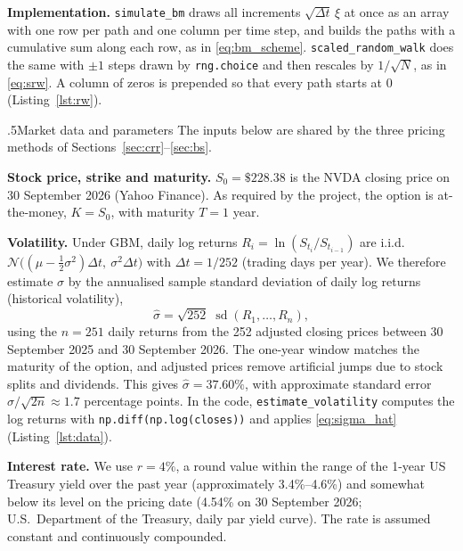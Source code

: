 \documentclass[12pt]{amsart}
\makeatletter
\def\subsection{\@startsection{subsection}{2}{\z@}{.7\linespacing\@plus\linespacing}%
  {.5\linespacing}{\normalfont\bfseries}}
\newcommand{\N}{\mathcal{N}}
\makeatother
\begin{document}
\noindent\textbf{Implementation.} \texttt{simulate\_bm} draws all increments $\sqrt{\Delta t}\,\xi$
at once as an array with one row per path and one column per time step, and builds the paths
with a cumulative sum along each row, as in \eqref{eq:bm_scheme}. \texttt{scaled\_random\_walk}
does the same with $\pm1$ steps drawn by \texttt{rng.choice} and then rescales by $1/\sqrt N$,
as in \eqref{eq:srw}. A column of zeros is prepended so that every path starts at $0$ (Listing~\ref{lst:rw}).

\subsection{Market data and parameters}
The inputs below are shared by the three pricing methods of Sections~\ref{sec:crr}--\ref{sec:bs}.

\noindent\textbf{Stock price, strike and maturity.} $S_0=\$228.38$ is the NVDA closing price on
30 September 2026 (Yahoo Finance). As required by the project, the option is at-the-money,
$K=S_0$, with maturity $T=1$ year.

\noindent\textbf{Volatility.} Under GBM, daily log returns
$R_i=\ln(S_{t_i}/S_{t_{i-1}})$ are i.i.d.\ $\N\bigl((\mu-\tfrac12\sigma^2)\Delta t,\ \sigma^2\Delta t\bigr)$
with $\Delta t=1/252$ (trading days per year). We therefore estimate $\sigma$ by the
annualised sample standard deviation of daily log returns (historical volatility),
\begin{equation}\label{eq:sigma_hat}
\hat\sigma=\sqrt{252}\;\operatorname{sd}(R_1,\dots,R_n),
\end{equation}
using the $n=251$ daily returns from the 252 adjusted closing prices between 30 September 2025
and 30 September 2026. The one-year window matches the maturity of the option, and adjusted
prices remove artificial jumps due to stock splits and dividends. This gives
$\hat\sigma=37.60\%$, with approximate standard error
$\hat\sigma/\sqrt{2n}\approx1.7$ percentage points. In the code, \texttt{estimate\_volatility}
computes the log returns with \texttt{np.diff(np.log(closes))} and applies \eqref{eq:sigma_hat}
(Listing~\ref{lst:data}).

\noindent\textbf{Interest rate.} We use $r=4\%$, a round value within the range of the 1-year
US Treasury yield over the past year (approximately 3.4\%--4.6\%) and somewhat below its level
on the pricing date (4.54\% on 30 September 2026; U.S.\ Department of the Treasury, daily par
yield curve). The rate is assumed constant and continuously compounded.
\end{document}
